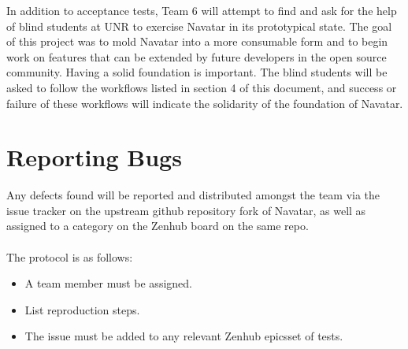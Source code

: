 \documentclass{scrreprt}
\begin{document}
In addition to acceptance tests, Team 6 will attempt to find and ask for the help of blind students at UNR to exercise Navatar in its prototypical state. The goal of this project was to mold Navatar into a more consumable form and to begin work on features that can be extended by future developers in the open source community. Having a solid foundation is important. The blind students will be asked to follow the workflows listed in section 4 of this document, and success or failure of these workflows will indicate the solidarity of the foundation of Navatar.

\section{Reporting Bugs}

Any defects found will be reported and distributed amongst the team via the issue tracker on the upstream github repository fork of Navatar, as well as assigned to a category on the Zenhub board on the same repo.\\\\The protocol is as follows:
\begin{itemize}
	\item A team member must be assigned.
	\item List reproduction steps.
	\item The issue must be added to any relevant Zenhub epicsset of tests.
\end{itemize}

\pagebreak
\end{document}
